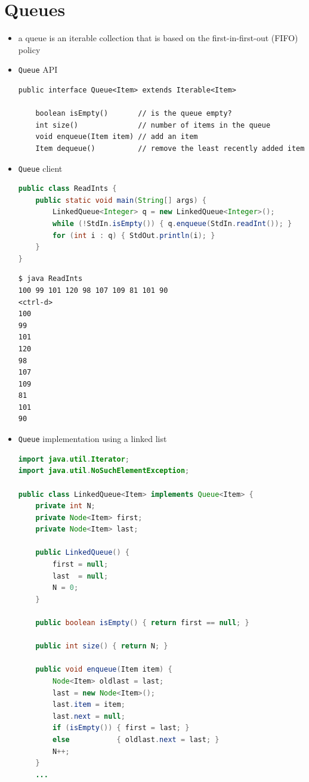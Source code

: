 \documentclass[8pt,a4paper,compress]{beamer}
\begin{document}
\section{Queues}
\begin{frame}[fragile]
\begin{itemize}
\item a queue is an iterable collection that is based on the first-in-first-out (FIFO) policy

\item \lstinline{Queue} API
\begin{lstlisting}[language={}]
public interface Queue<Item> extends Iterable<Item>

    boolean isEmpty()       // is the queue empty?
    int size()              // number of items in the queue
    void enqueue(Item item) // add an item
    Item dequeue()          // remove the least recently added item
\end{lstlisting}

\item \lstinline{Queue} client
\begin{lstlisting}[language=Java]
public class ReadInts {
    public static void main(String[] args) {
        LinkedQueue<Integer> q = new LinkedQueue<Integer>();
        while (!StdIn.isEmpty()) { q.enqueue(StdIn.readInt()); }
        for (int i : q) { StdOut.println(i); }
    }
}
\end{lstlisting}

\begin{lstlisting}[language={}]
$ java ReadInts
100 99 101 120 98 107 109 81 101 90
<ctrl-d>
100
99
101
120
98
107
109
81
101
90
\end{lstlisting}
\end{itemize}
\end{frame}

\begin{frame}[fragile]
\begin{itemize}
\item \lstinline{Queue} implementation using a linked list
\begin{lstlisting}[language=Java]
import java.util.Iterator;
import java.util.NoSuchElementException;

public class LinkedQueue<Item> implements Queue<Item> {
    private int N; 
    private Node<Item> first; 
    private Node<Item> last; 

    public LinkedQueue() {
        first = null;
        last  = null;
        N = 0;
    }

    public boolean isEmpty() { return first == null; }

    public int size() { return N; }

    public void enqueue(Item item) {
        Node<Item> oldlast = last;
        last = new Node<Item>();
        last.item = item;
        last.next = null;
        if (isEmpty()) { first = last; }
        else           { oldlast.next = last; }
        N++;
    }
    ...
\end{lstlisting}
\end{itemize}
\end{frame}
\end{document}
